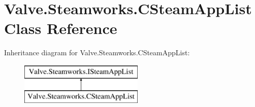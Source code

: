 \hypertarget{classValve_1_1Steamworks_1_1CSteamAppList}{}\section{Valve.\+Steamworks.\+C\+Steam\+App\+List Class Reference}
\label{classValve_1_1Steamworks_1_1CSteamAppList}
Inheritance diagram for Valve.\+Steamworks.\+C\+Steam\+App\+List\+:\begin{figure}[H]
\begin{center}
\leavevmode
\includegraphics[height=2.000000cm]{classValve_1_1Steamworks_1_1CSteamAppList}
\end{center}
\end{figure}
